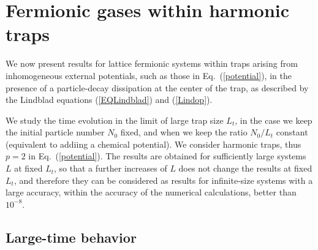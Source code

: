   
  
  \section{Fermionic gases within harmonic traps}
  \label{hartra}
  
  
  We now present results for lattice fermionic systems within traps
  arising from inhomogeneous external potentials, such as those in
  Eq.~(\ref{potential}), in the presence of a particle-decay dissipation
  at the center of the trap, as described by the Lindblad equations
  (\ref{EQLindblad}) and (\ref{Lindop}). 
  
  We study the time evolution in the limit of large trap size $L_t$, in
  the case we keep the initial particle number $N_0$ fixed, and when we
  keep the ratio $N_0/L_t$ constant (equivalent to addiing a chemical
  potential). We consider harmonic traps, thus $p=2$ in
  Eq.~(\ref{potential}). The results are obtained for sufficiently large
  systems $L$ at fixed $L_t$, so that a further increases of $L$ does
  not change the results at fixed $L_t$, and therefore they can be
  considered as results for infinite-size systems with a large accuracy,
  within the accuracy of the numerical calculations, better than
  $10^{-8}$.
  
  
  \subsection{Large-time behavior}
  \label{asytrap}
  
